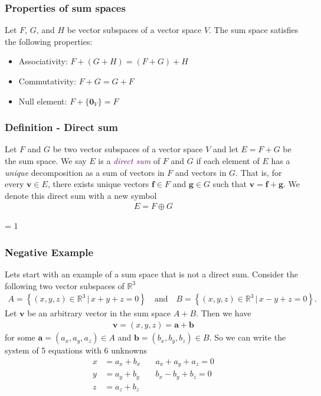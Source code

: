 \documentclass[usenames,dvipsnames,aspectratio=169,10pt]{beamer}
\def \EXAMPLEVERSION {1} %
\numberwithin{equation}{section}
\begin{document}
\begin{frame}
\frametitle{Properties of sum spaces}

Let $F$, $G$, and $H$ be vector subspaces of a vector space $V$. The sum space satisfies the following properties:
\begin{itemize}
\item Associativity: $F + (G + H) = (F + G) + H$
\item Commutativity: $F + G = G + F$
\item Null element: $F + \{\textbf{0}_V\} = F$
\end{itemize}


\end{frame}




\begin{frame}
\frametitle{Definition - Direct sum}

Let $F$ and $G$ be two vector subspaces of a vector space $V$ and let $E=F+G$ be the sum space. We say $E$ is a \textcolor{Purple}{\textit{direct sum}} of $F$ and $G$ if each element of $E$ has a \textit{unique} decomposition as a sum of vectors in $F$ and vectors in $G$. That is, for every $\textbf{v}\in E$, there exists unique vectors $\textbf{f}\in F$ and $\textbf{g}\in G$ such that $\textbf{v} = \textbf{f} + \textbf{g}$. We denote this direct sum with a new symbol
\begin{align*}
E = F \oplus G
\end{align*}
\end{frame}



\ifnum \EXAMPLEVERSION = 1
\begin{frame}
\frametitle{Negative Example}
Lets start with an example of a sum space that is not a direct sum. Consider the following two vector subspaces of $\mathbb{R}^3$
\begin{align*}
A = \left\{ (x,y,z) \in\mathbb{R}^3 \, | \, x+y+z=0  \right\} \quad\text{and}\quad
B = \left\{ (x,y,z) \in\mathbb{R}^3 \, | \, x-y+z=0  \right\}.
\end{align*}
Let $\textbf{v}$ be an arbitrary vector in the sum space $A+B$. Then we have
\begin{align*}
\textbf{v}= (x,y,z) = \textbf{a} + \textbf{b}
\end{align*}
for some $\textbf{a}=(a_x,a_y,a_z)\in A$ and $\textbf{b}=(b_x,b_y,b_z)\in B$. So we can write the system of 5 equations with 6 unknowns 
\begin{align*}
x &= a_x + b_x &\quad a_x + a_y + a_z = 0\\
y &= a_y + b_y &\quad b_x - b_y + b_z = 0 \\
z &= a_z + b_z
\end{align*}
\end{frame}
\end{document}
